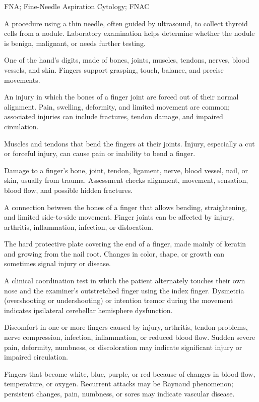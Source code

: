 \synonyms
FNA; Fine-Needle Aspiration Cytology; FNAC

 A procedure using a thin needle, often guided by ultrasound, to collect thyroid cells from a nodule. Laboratory examination helps determine whether the nodule is benign, malignant, or needs further testing.

 One of the hand’s digits, made of bones, joints, muscles, tendons, nerves, blood vessels, and skin. Fingers support grasping, touch, balance, and precise movements.

 An injury in which the bones of a finger joint are forced out of their normal alignment. Pain, swelling, deformity, and limited movement are common; associated injuries can include fractures, tendon damage, and impaired circulation.

 Muscles and tendons that bend the fingers at their joints. Injury, especially a cut or forceful injury, can cause pain or inability to bend a finger.

 Damage to a finger’s bone, joint, tendon, ligament, nerve, blood vessel, nail, or skin, usually from trauma. Assessment checks alignment, movement, sensation, blood flow, and possible hidden fractures.

 A connection between the bones of a finger that allows bending, straightening, and limited side-to-side movement. Finger joints can be affected by injury, arthritis, inflammation, infection, or dislocation.

 The hard protective plate covering the end of a finger, made mainly of keratin and growing from the nail root. Changes in color, shape, or growth can sometimes signal injury or disease.

 A clinical coordination test in which the patient alternately touches their own nose and the examiner's outstretched finger using the index finger. Dysmetria (overshooting or undershooting) or intention tremor during the movement indicates ipsilateral cerebellar hemisphere dysfunction.

 Discomfort in one or more fingers caused by injury, arthritis, tendon problems, nerve compression, infection, inflammation, or reduced blood flow. Sudden severe pain, deformity, numbness, or discoloration may indicate significant injury or impaired circulation.

 Fingers that become white, blue, purple, or red because of changes in blood flow, temperature, or oxygen. Recurrent attacks may be Raynaud phenomenon; persistent changes, pain, numbness, or sores may indicate vascular disease.

